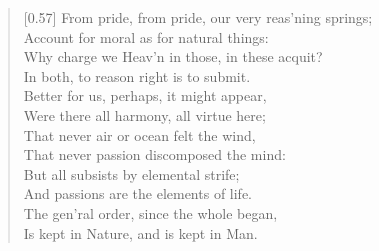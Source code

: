 \begin{verse}[0.57\textwidth]
From pride, from pride, our very reas'ning springs;\\
Account for moral as for natural things:\\
Why charge we Heav'n in those, in these acquit?\\
In both, to reason right is to submit.\\
\vin Better for us, perhaps, it might appear,\\
Were there all harmony, all virtue here;\\
That never air or ocean felt the wind,\\
That never passion discomposed the mind:\\
But all subsists by elemental strife;\\
And passions are the elements of life.\\
The gen'ral order, since the whole began,\\
Is kept in Nature, and is kept in Man.


\end{verse}
